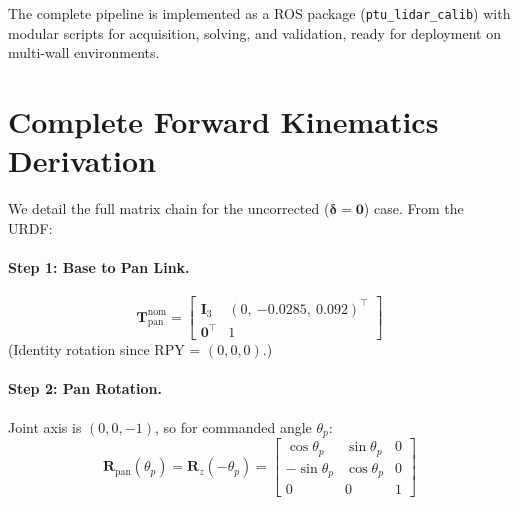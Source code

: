 \documentclass[12pt,a4paper]{article}
\newcommand{\T}{\mathbf{T}}
\newcommand{\Rot}{\mathbf{R}}
\newcommand{\Rz}{\mathbf{R}_z}
\newcommand{\code}[1]{\texttt{#1}}
\begin{document}
The complete pipeline is implemented as a ROS package
(\code{ptu\_lidar\_calib}) with modular scripts for acquisition,
solving, and validation, ready for deployment on multi-wall environments.


\appendix
\section{Complete Forward Kinematics Derivation}
\label{app:fk_derivation}

We detail the full matrix chain for the uncorrected ($\bm{\delta}=\mathbf{0}$)
case. From the URDF:

\paragraph{Step 1: Base to Pan Link.}
\begin{equation}
    \T_{\text{pan}}^{\text{nom}} =
    \begin{bmatrix}
        \mathbf{I}_3 & (0,\ {-0.0285},\ 0.092)^\top \\
        \mathbf{0}^\top & 1
    \end{bmatrix}
\end{equation}
(Identity rotation since RPY = $(0,0,0)$.)

\paragraph{Step 2: Pan Rotation.}
Joint axis is $(0,0,-1)$, so for commanded angle $\theta_p$:
\begin{equation}
    \Rot_{\text{pan}}(\theta_p) = \Rz(-\theta_p) =
    \begin{bmatrix}
        \cos\theta_p & \sin\theta_p & 0 \\
        -\sin\theta_p & \cos\theta_p & 0 \\
        0 & 0 & 1
    \end{bmatrix}
\end{equation}
\end{document}
